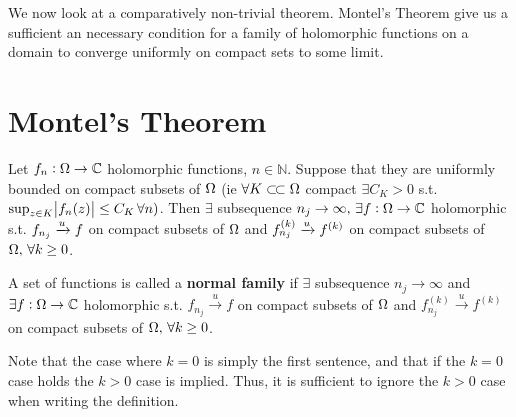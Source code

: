 \begin{center}
\end{center}





We now look at a comparatively non-trivial theorem. Montel's Theorem give us a sufficient an necessary condition for a family of holomorphic functions on a domain to converge uniformly on compact sets to some limit.


\section{Montel's Theorem}

\begin{theorem}\label{thm:montel}
Let $f_n: \Omega \to \mathbb{C}$ holomorphic functions, $n \in \mathbb{N}$. Suppose that they are uniformly bounded on compact subsets of $\Omega$ (ie $\forall K \ssubset \om $ compact $ \exists C_K > 0 $ s.t. $ \sup_{z \in K} \abs{f_n(z)} \leq C_K \, \forall n)$. Then $\exists $ subsequence $n_j \to \infty, \, \exists f:\Omega \rightarrow \mathbb{C}  $ holomorphic s.t. $f_{n_j} \xrightarrow[]{u} f$ on compact subsets  of $\Omega$ and $f_{n_j}^{(k)} \xrightarrow[]{u} f^{(k)}$ on compact subsets of $\Omega , \, \forall k \geq 0$.
\end{theorem}


\begin{definition}
A set of functions is called a \textbf{normal family} if $\exists $ subsequence $n_j \to \infty$ and $ \exists f:\Omega \rightarrow \mathbb{C}  $ holomorphic s.t. $f_{n_j} \xrightarrow[]{u} f$ on compact subsets of $\Omega$ and $f_{n_j}^{(k)} \xrightarrow[]{u} f^{(k)}$ on compact subsets of $\Omega , \, \forall k \geq 0$.

Note that the case where $k=0$ is simply the first sentence, and that if the $k=0$ case holds the $k>0$ case is implied. Thus, it is sufficient to ignore the $k>0$ case when writing the definition.
\end{definition}


